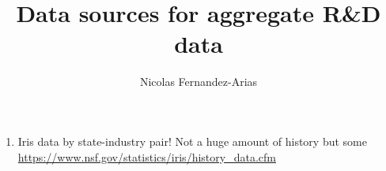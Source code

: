 \documentclass[12pt,english]{article}
\theoremstyle{remark}
\begin{document}
	
	\title{Data sources for aggregate R\&D data}
	\author{Nicolas Fernandez-Arias}
	\maketitle
	
\begin{enumerate}
	\item Iris data by state-industry pair! Not a huge amount of history but some \href{Iris}{https://www.nsf.gov/statistics/iris/history\_data.cfm}
\end{enumerate}
	
	
	
	
	
\end{document}

